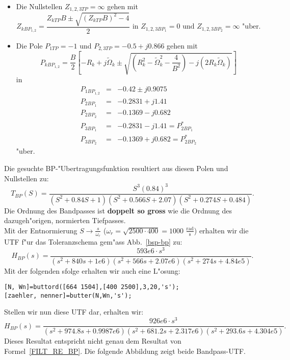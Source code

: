 \begin{itemize}
\item Die Nullstellen  $Z_{1,2,3TP}=\infty$  gehen mit
\begin{equation*}
Z_{kBP_{1,2}}=\frac{Z_{kTP}B \pm \sqrt{(Z_{kTP}B)^{2}-4}}{2}
\mbox{ in }Z_{1,2,3BP_{1}}=0\mbox{ und }Z_{1,2,3BP_{2}}=\infty\mbox{ "uber.}
\end{equation*}
\item Die Pole  $P_{1TP}=- 1$  und  $ P_{2,3TP}=- 0.5 + j 0.866$
gehen mit
\[
P_{kBP_{1,2}}=\frac{B}{2}\left[-R_{k}+j\tilde{\Omega}_{k} \pm
\sqrt{\left(R_{k}^{2}-\tilde{\Omega}^{2}_{k}-\frac{4}{B^{2}}\right)-j(2R_{k}
\tilde{\Omega}_{k})}\right]
\]
\nit in
\begin{eqnarray*}
P_{1BP_{1,2}} &=& -0.42 \pm j0.9075\\
P_{2BP_{1}} &=& -0.2831 + j1.41\\
P_{2BP_{2}} &=& -0.1369-j0.682\\
P_{3BP_{1}} &=& -0.2831-j1.41=P^{*}_{2BP_{1}}\\
P_{3BP_{2}} &=& -0.1369 + j0.682=P^{*}_{2BP_{2}}
\end{eqnarray*}
\nit "uber.
\end{itemize}
\nit Die gesuchte BP-"Ubertragungsfunktion resultiert aus diesen Polen und
Nullstellen zu:
\[
T_{BP}(S)=\frac{S^{3}(0.84)^3}{(S^{2}+0.84S+1)(S^{2}+0.566S+2.07)
(S^{2}+0.274S+0.484)}.
\]
Die Ordnung des Bandpasses ist {\bf doppelt so gross} wie die Ordnung des dazugeh"origen, normierten Tiefpasses.\\
\nit Mit der Entnormierung $S\rightarrow \frac{s}{\omega_r }$ ($\omega_r=\sqrt{2500\cdot 400}=1000\text{~}\frac{\text{rad}}{\text{s}}$) erhalten wir die UTF f"ur das Toleranzschema gem"ass Abb.~\ref{bsp-bp} zu:
\begin{equation}
H_{BP}(s)=\frac{593e6\cdot s^{3}}{(s^{2}+840s+1e6)(s^{2}+566s+2.07e6)
(s^{2}+274s+4.84e5)}.\label{FILT_RE_BP}
\end{equation}
Mit der folgenden \mb\!\!sfolge erhalten wir auch eine L"osung:
\begin{verbatim}
[N, Wn]=buttord([664 1504],[400 2500],3,20,'s');
[zaehler, nenner]=butter(N,Wn,'s');
\end{verbatim}
Stellen wir nun diese UTF dar, erhalten wir:
\[
H_{BP}(s)=\frac{926e6\cdot s^{3}}{(s^{2}+974.8s+0.9987e6)(s^{2}+681.2s+2.317e6)
(s^{2}+293.6s+4.304e5)}.
\]
Dieses Resultat entspricht nicht genau dem Resultat von Formel~\ref{FILT_RE_BP}. Die folgende Abbildung zeigt beide Bandpass-UTF.
